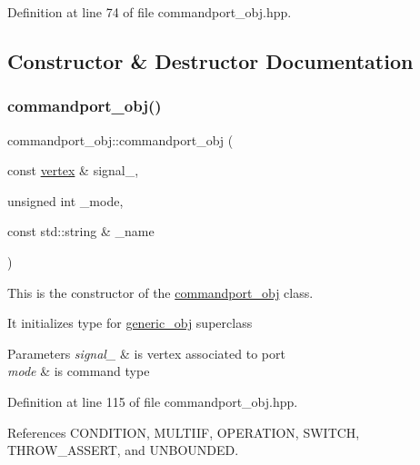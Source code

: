 Definition at line 74 of file commandport\+\_\+obj.\+hpp.



\subsection{Constructor \& Destructor Documentation}
\mbox{\label{classcommandport__obj_afa7782482a04c58e664ec83fca431aed}} 
\subsubsection{\texorpdfstring{commandport\+\_\+obj()}{commandport\_obj()}\hspace{0.1cm}{\footnotesize\ttfamily [1/2]}}
{\footnotesize\ttfamily commandport\+\_\+obj\+::commandport\+\_\+obj (\begin{DoxyParamCaption}\item[{const \hyperlink{graph_8hpp_abefdcf0544e601805af44eca032cca14}{vertex} \&}]{signal\+\_\+,  }\item[{unsigned int}]{\+\_\+mode,  }\item[{const std\+::string \&}]{\+\_\+name }\end{DoxyParamCaption})\hspace{0.3cm}{\ttfamily [inline]}}



This is the constructor of the \hyperlink{classcommandport__obj}{commandport\+\_\+obj} class. 

It initializes type for \hyperlink{classgeneric__obj}{generic\+\_\+obj} superclass 
\begin{DoxyParams}{Parameters}
{\em signal\+\_\+} & is vertex associated to port \\
\hline
{\em mode} & is command type \\
\hline
\end{DoxyParams}


Definition at line 115 of file commandport\+\_\+obj.\+hpp.



References C\+O\+N\+D\+I\+T\+I\+ON, M\+U\+L\+T\+I\+IF, O\+P\+E\+R\+A\+T\+I\+ON, S\+W\+I\+T\+CH, T\+H\+R\+O\+W\+\_\+\+A\+S\+S\+E\+RT, and U\+N\+B\+O\+U\+N\+D\+ED.

\mbox{\label{classcommandport__obj_a1e7f9bee49cac57a8ef84dbc9c37a456}} 
